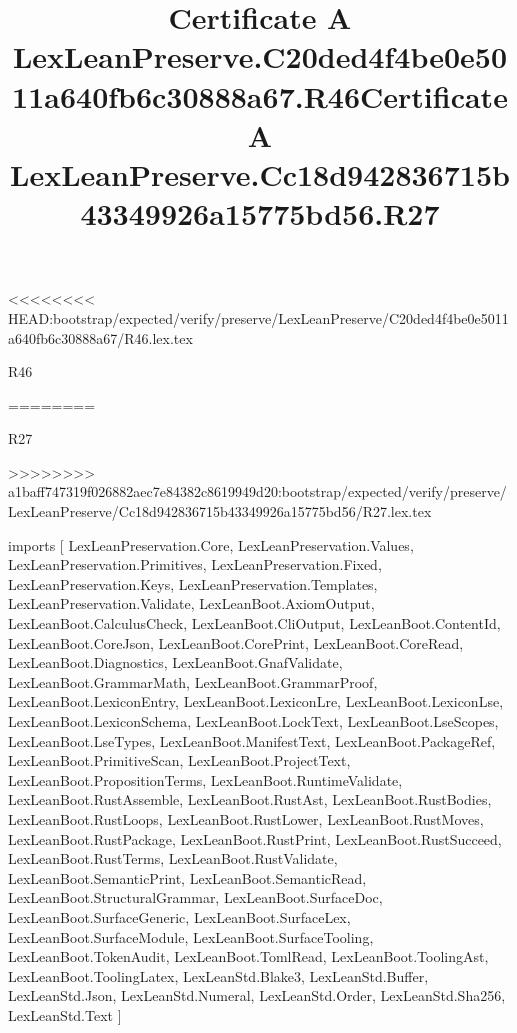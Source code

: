 <<<<<<<< HEAD:bootstrap/expected/verify/preserve/LexLeanPreserve/C20ded4f4be0e5011a640fb6c30888a67/R46.lex.tex
\begin{lexlean}{R46}
\title{Certificate A LexLeanPreserve.C20ded4f4be0e5011a640fb6c30888a67.R46}
========
\begin{lexlean}{R27}
\title{Certificate A LexLeanPreserve.Cc18d942836715b43349926a15775bd56.R27}
>>>>>>>> a1baff747319f026882aec7e84382c8619949d20:bootstrap/expected/verify/preserve/LexLeanPreserve/Cc18d942836715b43349926a15775bd56/R27.lex.tex
\begin{coremodule}
imports [
  LexLeanPreservation.Core,
  LexLeanPreservation.Values,
  LexLeanPreservation.Primitives,
  LexLeanPreservation.Fixed,
  LexLeanPreservation.Keys,
  LexLeanPreservation.Templates,
  LexLeanPreservation.Validate,
  LexLeanBoot.AxiomOutput,
  LexLeanBoot.CalculusCheck,
  LexLeanBoot.CliOutput,
  LexLeanBoot.ContentId,
  LexLeanBoot.CoreJson,
  LexLeanBoot.CorePrint,
  LexLeanBoot.CoreRead,
  LexLeanBoot.Diagnostics,
  LexLeanBoot.GnafValidate,
  LexLeanBoot.GrammarMath,
  LexLeanBoot.GrammarProof,
  LexLeanBoot.LexiconEntry,
  LexLeanBoot.LexiconLre,
  LexLeanBoot.LexiconLse,
  LexLeanBoot.LexiconSchema,
  LexLeanBoot.LockText,
  LexLeanBoot.LseScopes,
  LexLeanBoot.LseTypes,
  LexLeanBoot.ManifestText,
  LexLeanBoot.PackageRef,
  LexLeanBoot.PrimitiveScan,
  LexLeanBoot.ProjectText,
  LexLeanBoot.PropositionTerms,
  LexLeanBoot.RuntimeValidate,
  LexLeanBoot.RustAssemble,
  LexLeanBoot.RustAst,
  LexLeanBoot.RustBodies,
  LexLeanBoot.RustLoops,
  LexLeanBoot.RustLower,
  LexLeanBoot.RustMoves,
  LexLeanBoot.RustPackage,
  LexLeanBoot.RustPrint,
  LexLeanBoot.RustSucceed,
  LexLeanBoot.RustTerms,
  LexLeanBoot.RustValidate,
  LexLeanBoot.SemanticPrint,
  LexLeanBoot.SemanticRead,
  LexLeanBoot.StructuralGrammar,
  LexLeanBoot.SurfaceDoc,
  LexLeanBoot.SurfaceGeneric,
  LexLeanBoot.SurfaceLex,
  LexLeanBoot.SurfaceModule,
  LexLeanBoot.SurfaceTooling,
  LexLeanBoot.TokenAudit,
  LexLeanBoot.TomlRead,
  LexLeanBoot.ToolingAst,
  LexLeanBoot.ToolingLatex,
  LexLeanStd.Blake3,
  LexLeanStd.Buffer,
  LexLeanStd.Json,
  LexLeanStd.Numeral,
  LexLeanStd.Order,
  LexLeanStd.Sha256,
  LexLeanStd.Text
]


\end{coremodule}
\end{lexlean}
\end{lexlean}
